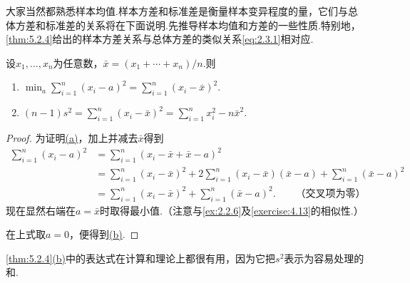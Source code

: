大家当然都熟悉样本均值.样本方差和标准差是衡量样本变异程度的量，它们与总体方差和标准差的关系将在下面说明.先推导样本均值和方差的一些性质.特别地，\autoref{thm:5.2.4}给出的样本方差关系与总体方差的类似关系\eqref{eq:2.3.1}相对应.
\begin{theorem}\label{thm:5.2.4}
设$x_1,\ldots,x_n$为任意数，$\bar x=(x_1+\cdots+x_n)/n$.则
\begin{enumerate}[label=\textbf{\alph*.}]
\item\label{item:5.2.4a} $\min_a\sum_{i=1}^n(x_i-a)^2=\sum_{i=1}^n(x_i-\bar x)^2$.
\item\label{item:5.2.4b} $(n-1)s^2=\sum_{i=1}^n(x_i-\bar x)^2=\sum_{i=1}^n x_i^2-n\bar x^2$.
\end{enumerate}
\end{theorem}
\begin{proof}
为证明\hyperref[item:5.2.4a]{(a)}，加上并减去$\bar x$得到
\begin{align*}
\sum_{i=1}^n(x_i-a)^2&=\sum_{i=1}^n(x_i-\bar x+\bar x-a)^2\\
&=\sum_{i=1}^n(x_i-\bar x)^2+2\sum_{i=1}^n(x_i-\bar x)(\bar x-a)+\sum_{i=1}^n(\bar x-a)^2\\
&=\sum_{i=1}^n(x_i-\bar x)^2+\sum_{i=1}^n(\bar x-a)^2.\qquad\text{（交叉项为零）}
\end{align*}
现在显然右端在$a=\bar x$时取得最小值.（注意与\autoref{ex:2.2.6}及\autoref{exercise:4.13}的相似性.）

在上式取$a=0$，便得到\hyperref[item:5.2.4b]{(b)}.
\end{proof}
\autoref{thm:5.2.4}\hyperref[item:5.2.4b]{(b)}中的表达式在计算和理论上都很有用，因为它把$s^2$表示为容易处理的和.

